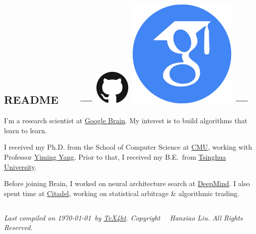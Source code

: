 \documentclass{article}
\begin{document}
\subsection*{README \ \ \ --- \protect
\href{https://github.com/quark0}{\includegraphics[natwidth=22, natheight=22]{img/GitHub-Mark-64px.png}}
\href{https://scholar.google.com/citations?user=IMkVH_8AAAAJ&hl=en}{\includegraphics[natwidth=22, natheight=22]{img/google-scholar.png}}
---
}
I'm a research scientist at \href{https://ai.google/research/teams/brain}{Google Brain}.
My interest is to build algorithms that learn to learn.

\noindent I received my Ph.D. from
the School of Computer Science at
\href{http://www.cmu.edu/index.shtml}{CMU},
working with Professor \href{http://www.cs.cmu.edu/~yiming/publications.html}{Yiming Yang}.
Prior to that,
I received my B.E.\ from
\href{http://www.tsinghua.edu.cn/publish/newthuen/index.html}{Tsinghua University}.

\noindent Before joining Brain,
I worked on neural architecture search at \href{https://deepmind.com/}{DeepMind}.
I also spent time at \href{https://www.citadel.com/}{Citadel}, working on statistical arbitrage \& algorithmic trading.

\subsection*{}
\footnotesize{
    \textit{
        Last compiled on \today\ by \href{http://www.tug.org/tex4ht/}{\TeX4ht}. \newline
        Copyright \textcopyright\ \the\year\ Hanxiao Liu. All Rights Reserved.
    }
}
\end{document}
